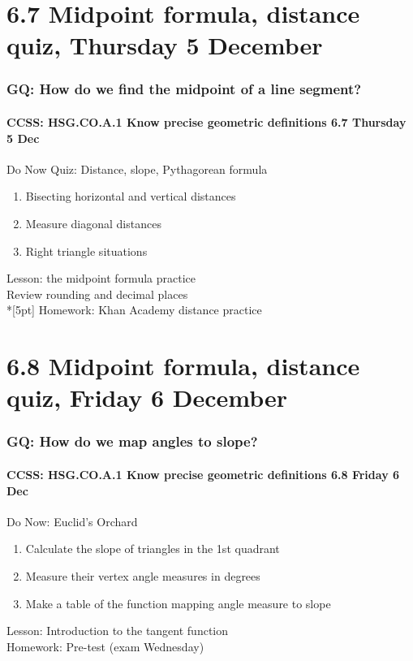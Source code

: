 \documentclass{beamer}
\begin{document}
  \section{6.7 Midpoint formula, distance quiz, Thursday 5 December}
  \frame
  {
    \frametitle{GQ: How do we find the midpoint of a line segment?}
    \framesubtitle{CCSS: HSG.CO.A.1 Know precise geometric definitions \hfill \alert{6.7 Thursday 5 Dec}}

    \begin{block}{Do Now Quiz: Distance, slope, Pythagorean formula}
    \begin{enumerate}
      \item Bisecting horizontal and vertical distances
      \item Measure diagonal distances
      \item Right triangle situations
    \end{enumerate}
    \end{block}
    Lesson: the midpoint formula practice\\
    Review rounding and decimal places \\*[5pt]
    Homework: Khan Academy distance practice
  }

  \section{6.8 Midpoint formula, distance quiz, Friday 6 December}
  \frame
  {
    \frametitle{GQ: How do we map angles to slope?}
    \framesubtitle{CCSS: HSG.CO.A.1 Know precise geometric definitions \hfill \alert{6.8 Friday 6 Dec}}

    \begin{block}{Do Now: Euclid's Orchard}
    \begin{enumerate}
      \item Calculate the slope of triangles in the 1st quadrant
      \item Measure their vertex angle measures in degrees
      \item Make a table of the function mapping angle measure to slope
    \end{enumerate}
    \end{block}
    Lesson: Introduction to the tangent function \\
    Homework: Pre-test (\alert{exam Wednesday})
  }
\end{document}
